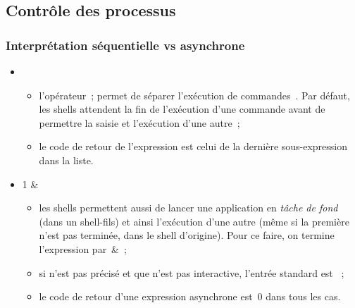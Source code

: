 \subsection{Contr\^ole des processus}%
\begin{frame}[fragile]
  \frametitle{Interpr\'etation s\'equentielle vs asynchrone}
  \begin{itemize}
  \item {}  
    \begin{itemize}
    \item l'op\'erateur~; permet de s\'eparer l'ex\'ecution de
      commandes~.  Par d\'efaut, les shells
      attendent la fin de l'ex\'ecution d'une commande avant de
      permettre la saisie et l'ex\'ecution d'une autre~;
    \item le code de retour de l'expression est celui de la derni\`ere
      sous-expression dans la liste.
    \end{itemize}
  \item {}1 \&  
    \begin{itemize}
    \item les shells permettent aussi de lancer une application en
      \textit{t\^ache de fond} (dans un shell-fils) et ainsi
      l'ex\'ecution d'une autre (m\^eme si la premi\`ere n'est pas
      termin\'ee, dans le shell d'origine).  Pour ce faire, on termine
      l'expression par~\&~;
    \item si \stdin{} n'est pas pr\'ecis\'e et que
       n'est pas interactive, l'entr\'ee standard
      est ~;
    \item le code de retour d'une expression asynchrone est~$0$ dans
      tous les cas.
    \end{itemize}
  \end{itemize}
\end{frame}
